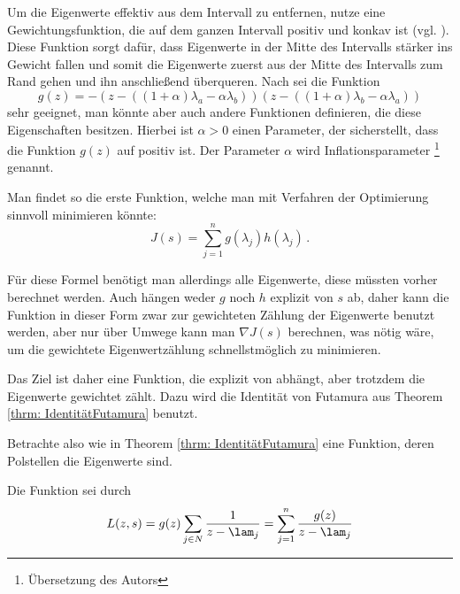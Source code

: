 \documentclass[a4paper,12pt]{report}
\newcommand{\zitat}[1]{\glqq #1\grqq}
\newcommand{\1}{\mathds{1}}
\theoremstyle{plain} %
\theoremstyle{definition} %
\theoremstyle{remark}
\begin{document}
            Um die Eigenwerte effektiv aus dem Intervall zu entfernen, nutze eine Gewichtungsfunktion, die auf dem ganzen Intervall positiv und konkav ist (vgl. \cite[S. 3]{hauptteilTkachuk}).
            Diese Funktion sorgt dafür, dass Eigenwerte in der Mitte des Intervalls stärker ins Gewicht fallen
            und somit die Eigenwerte zuerst aus der Mitte des Intervalls zum Rand gehen und ihn anschließend überqueren.
            Nach \cite[S. 3]{hauptteilTkachuk} sei die Funktion
            $$g(z) = -(z-((1+\alpha)\lambda_a -\alpha\lambda_b))(z-((1+\alpha)\lambda_b-\alpha\lambda_a))$$
            sehr geeignet, man könnte aber auch andere Funktionen definieren, die diese Eigenschaften besitzen.
            Hierbei ist $\alpha>0$ einen Parameter, der sicherstellt, dass die Funktion $g(z)$ auf \lamAlamB positiv ist.
            Der Parameter $\alpha$ wird \zitat{Inflationsparameter} \cite[S. 3]{hauptteilTkachuk}\footnote{Übersetzung des Autors} genannt.

            Man findet so die erste Funktion, welche man mit Verfahren der Optimierung sinnvoll minimieren könnte:
            \begin{equation}
                  \label{def: J original}
                  J(s) = \sum_{j=1}^n g(\lambda_j)h(\lambda_j)\,.
            \end{equation}

            Für diese Formel benötigt man allerdings alle Eigenwerte, diese müssten vorher berechnet werden.
            Auch hängen weder $g$ noch $h$ explizit von $s$ ab, daher kann die Funktion \J in dieser Form zwar zur gewichteten Zählung der Eigenwerte benutzt werden,
            aber nur über Umwege kann man $\nabla J(s)$ berechnen, was nötig wäre, um die gewichtete Eigenwertzählung schnellstmöglich zu minimieren.
            
            Das Ziel ist daher eine Funktion, die explizit von \s abhängt, aber trotzdem die Eigenwerte gewichtet zählt.
            Dazu wird die Identität von Futamura aus Theorem \ref{thrm: IdentitätFutamura} benutzt.

            Betrachte also wie in Theorem \ref{thrm: IdentitätFutamura} eine Funktion, deren Polstellen die Eigenwerte sind.

            Die Funktion sei durch
            \begin{equation}
                  \label{eqn: ZielfunktionMitPolstellen}
                  L(z, s) = g(z)\sum_{j\in N} \frac{1}{z-\lam_j} = \sum_{j=1}^n \frac{g(z)}{z-\lam_j}
            \end{equation}
\end{document}
